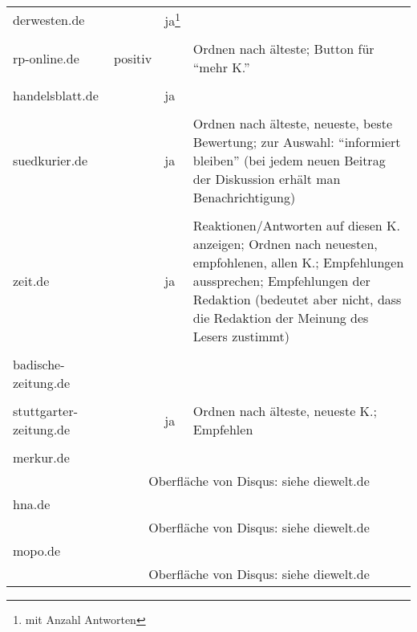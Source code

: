 \begin{landscape}
\begin{longtable}{l|p{40mm}p{40mm}p{80mm}}
  derwesten.de & & ja\footnote{mit Anzahl Antworten} & \\
               & \multicolumn{3}{c}{}\\\hline

  rp-online.de & positiv & & Ordnen nach älteste; Button für ``mehr K.''\\
            & \multicolumn{3}{c}{}\\\hline

  handelsblatt.de & & ja & \\
               & \multicolumn{3}{c}{}\\\hline

  suedkurier.de & & ja &
    Ordnen nach älteste, neueste, beste Bewertung; zur Auswahl: ``informiert
    bleiben'' (bei jedem neuen Beitrag der Diskussion erhält man
    Benachrichtigung)\\
    & \multicolumn{3}{c}{}\\\hline

  zeit.de & & ja &
    Reaktionen/Antworten auf diesen K. anzeigen; Ordnen nach neuesten,
    empfohlenen, allen K.; Empfehlungen aussprechen; Empfehlungen der Redaktion
    (bedeutet aber nicht, dass die Redaktion der Meinung des Lesers zustimmt)\\
    & \multicolumn{3}{c}{}\\\hline

  badische-zeitung.de & & & \\
                   & \multicolumn{3}{c}{} \\\hline

  stuttgarter-zeitung.de & & ja & Ordnen nach älteste, neueste K.; Empfehlen\\
                      & \multicolumn{3}{c}{}\\\hline

  merkur.de &  & & \\
         & \multicolumn{3}{c}{Oberfläche von Disqus: siehe diewelt.de}\\\hline


  hna.de & & & \\
      & \multicolumn{3}{c}{Oberfläche von Disqus: siehe diewelt.de}\\\hline

  mopo.de & & & \\
         & \multicolumn{3}{c}{Oberfläche von Disqus: siehe diewelt.de}\\\hline


\end{longtable}
\end{landscape}
